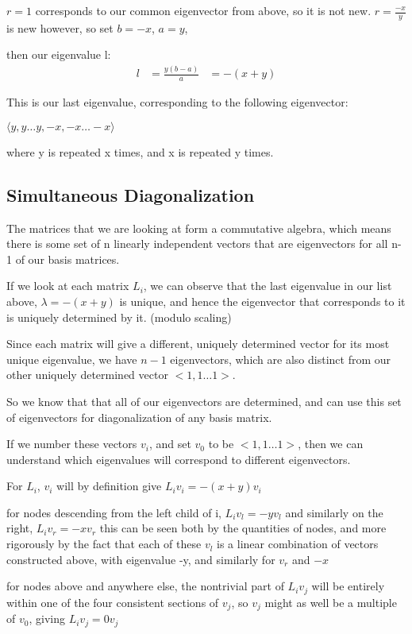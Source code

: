 \documentclass{report}
\begin{document}
$r = 1$ corresponds to our common eigenvector from above, so it is not new.
$r = \frac{-x}{y}$ is new however, so set $b = -x$, $a = y$,

then our eigenvalue l:
\begin{align*}
	l &= \frac{y(b - a)}{a}
	  &= -(x + y)
\end{align*}

This is our last eigenvalue, corresponding to the following eigenvector:

$\langle y, y\ldots y, -x, -x\ldots -x\rangle$

where y is repeated x times, and x is repeated y times.


\subsection{Simultaneous Diagonalization}

The matrices that we are looking at form a commutative algebra, which means
there is some set of n linearly independent vectors that are eigenvectors for
all n-1 of our basis matrices.

If we look at each matrix $L_i$, we can observe that the last eigenvalue in our
list above, $\lambda = -(x + y)$ is unique, and hence the eigenvector that corresponds
to it is uniquely determined by it. (modulo scaling)

Since each matrix will give a different, uniquely determined vector for its
most unique eigenvalue, we have $n-1$ eigenvectors, which are also distinct from
our other uniquely determined vector $<1, 1\ldots 1>$.

So we know that that all of our eigenvectors are determined, and can use this
set of eigenvectors for diagonalization of any basis matrix.


If we number these vectors $v_i$, and set $v_0$ to be $<1, 1\ldots 1>$, then we can
understand which eigenvalues will correspond to different eigenvectors.

For $L_i$, $v_i$ will by definition give $L_i v_i = -(x+y) v_i$

for nodes descending from the left child of i, $L_i v_l = -y v_l$
and similarly on the right, $L_i v_r = -x v_r$
this can be seen both by the quantities of nodes, and more rigorously by the
fact that each of these $v_l$ is a linear combination of vectors constructed
above, with eigenvalue -y, and similarly for $v_r$ and $-x$

for nodes above and anywhere else, the nontrivial part of $L_i v_j$ will be
entirely within one of the four consistent sections of $v_j$, so $v_j$ might as
well be a multiple of $v_0$, giving $L_i v_j = 0 v_j$
\end{document}
